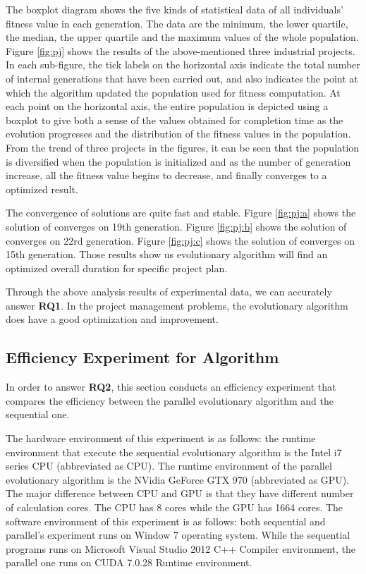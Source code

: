 The boxplot diagram shows the five kinds of statistical data of all individuals'
fitness value in each generation. The data are the minimum, the lower quartile,
the median, the upper quartile and the maximum values of the whole
population. Figure \ref{fig:pj} shows the results of the above-mentioned three
industrial projects. In each sub-figure, the tick labels on the horizontal axis
indicate the total number of internal generations that have been carried out,
and also indicates the point at which the algorithm updated the population used
for fitness computation. At each point on the horizontal axis, the entire
population is depicted using a boxplot to give both a sense of the values
obtained for completion time as the evolution progresses and the distribution of
the fitness values in the population. From the trend of three projects in the
figures, it can be seen that the population is diversified when the population
is initialized and as the number of generation increase, all the fitness value
begins to decrease, and finally converges to a optimized result.

The convergence of solutions are quite fast and stable. Figure \ref{fig:pj:a}
shows the solution of \projectA{} converges on 19th generation. Figure
\ref{fig:pj:b} shows the solution of \projectB{} converges on 22rd generation.
Figure \ref{fig:pj:c} shows the solution of \projectC{} converges on 15th
generation. Those results show us evolutionary algorithm will find an optimized
overall duration for specific project plan.

Through the above analysis results of experimental data, we can accurately
answer \textbf{RQ1}. In the project management problems, the evolutionary
algorithm does have a good optimization and improvement.


\subsection{Efficiency Experiment for Algorithm}
%
In order to answer \textbf{RQ2}, this section conducts an efficiency experiment
that compares the efficiency between the parallel evolutionary algorithm and the
sequential one.

The hardware environment of this experiment is as follows: the runtime
environment that execute the sequential evolutionary algorithm is the Intel i7
series CPU (abbreviated as CPU). The runtime environment of the parallel
evolutionary algorithm is the NVidia GeForce GTX 970 (abbreviated as GPU).  The
major difference between CPU and GPU is that they have different number of
calculation cores. The CPU has 8 cores while the GPU has 1664 cores. The
software environment of this experiment is as follows: both sequential and
parallel's experiment runs on Window 7 operating system. While the sequential
programs runs on Microsoft Visual Studio 2012 C++ Compiler environment, the
parallel one runs on CUDA 7.0.28 Runtime environment.

